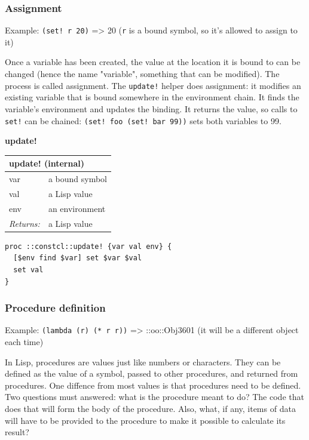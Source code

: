 \documentclass[twoside,9pt]{report}
\begin{document}
\subsubsection{Assignment}
\label{assignment}

Example: \texttt{(set! r 20)} => 20 (\texttt{r} is a bound symbol, so it's allowed to assign to it)


Once a variable has been created, the value at the location it is bound to can be changed (hence the name "variable", something that can be modified). The process is called assignment. The \texttt{update!} helper does assignment: it modifies an existing variable that is bound somewhere in the environment chain. It finds the variable's environment and updates the binding. It returns the value, so calls to \texttt{set!} can be chained: \texttt{(set! foo (set! bar 99))} sets both variables to 99.


\textbf{update!}

\begin{tabular}{ |l l| }
\hline
\multicolumn{2}{|l|}{update! (internal)} \\
\hline
var & a bound symbol \\
val & a Lisp value \\
env & an environment \\
\textit{Returns:} & a Lisp value \\
\hline
\end{tabular}

\noindent\makebox[\linewidth]{\rule{\linewidth}{0.4pt}}
\begin{lstlisting}
proc ::constcl::update! {var val env} {
  [$env find $var] set $var $val
  set val
}
\end{lstlisting}
\noindent\makebox[\linewidth]{\rule{\linewidth}{0.4pt}}
\subsubsection{Procedure definition}
\label{procedure-definition}

Example: \texttt{(lambda (r) (* r r))} => ::oo::Obj3601 (it will be a different object each time)


In Lisp, procedures are values just like numbers or characters. They can be defined as the value of a symbol, passed to other procedures, and returned from procedures. One diffence from most values is that procedures need to be defined. Two questions must answered: what is the procedure meant to do? The code that does that will form the body of the procedure. Also, what, if any, items of data will have to be provided to the procedure to make it possible to calculate its result?
\end{document}

